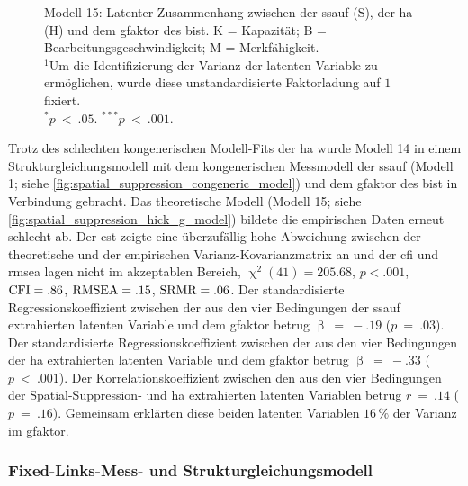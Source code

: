 \documentclass[11pt, twoside, a4paper]{book}		%
\begin{document}
\begin{figure}[p]
\begin{adjustbox}{width=1\textwidth, keepaspectratio}
\begin{tikzpicture}
		\end{tikzpicture}
	\end{adjustbox}
	\vspace{.2cm}
	\caption[Modell 15: Strukturgleichungsmodell zur Vorhersage des \gls{gfaktor}s durch die Spa\-ti\-al-Sup\-pres\-sion- und die \gls{ha}]{Modell 15: Latenter Zusammenhang zwischen der \gls{ssauf} (\textsf{S}), der \gls{ha} (\textsf{H}) und dem \gls{gfaktor} des \gls{bist}. \textsf{K} = Kapazität; \textsf{B} = Bearbeitungsgeschwindigkeit; \textsf{M} = Merkfähigkeit.\\
		$^1$Um die Identifizierung der Varianz der latenten Variable zu ermöglichen, wurde diese unstandardisierte Faktorladung auf $1$ fixiert.\\
		$^{*}p~<~.05$. $^{***}p~<~.001$.}
	\label{fig:spatial_suppression_hick_g_model}
\end{figure}

Trotz des schlechten kongenerischen Modell-Fits der \gls{ha} wurde Modell 14 in einem Strukturgleichungsmodell mit dem kongenerischen Messmodell der \gls{ssauf} (Modell 1; siehe \autoref{fig:spatial_suppression_congeneric_model}) und dem \gls{gfaktor} des \gls{bist} in Verbindung gebracht. Das theoretische Modell (Modell 15; siehe \autoref{fig:spatial_suppression_hick_g_model}) bildete die empirischen Daten erneut schlecht ab.  Der \gls{cst} zeigte eine überzufällig hohe Abweichung zwischen der theoretische und der empirischen Var\-ianz-Ko\-var\-ianz\-ma\-trix an und der \gls{cfi} und \gls{rmsea} lagen nicht im akzeptablen Bereich, $\upchi^2(41)=205.68$, $p<.001$, $\textnormal{CFI}=.86$, $\textnormal{RMSEA}=.15$, $\textnormal{SRMR}=.06$. 
Der standardisierte Regressionskoeffizient zwischen der aus den vier Bedingungen der \gls{ssauf} extrahierten latenten Variable und dem \gls{gfaktor} betrug $\upbeta~=~-.19$ ($p~=~.03$). Der standardisierte Regressionskoeffizient zwischen der aus den vier Bedingungen der \gls{ha} extrahierten latenten Variable und dem \gls{gfaktor} betrug $\upbeta~=~-.33$ ($p~<~.001$). Der Korrelationskoeffizient zwischen den aus den vier Bedingungen der Spatial-Suppression- und \gls{ha} extrahierten latenten Variablen betrug $r~=~.14$ ($p~=~.16$). Gemeinsam erklärten diese beiden latenten Variablen $16\,\%$ der Varianz im \gls{gfaktor}.




\subsubsection*{Fixed-Links-Mess- und Strukturgleichungsmodell}
\end{document}
